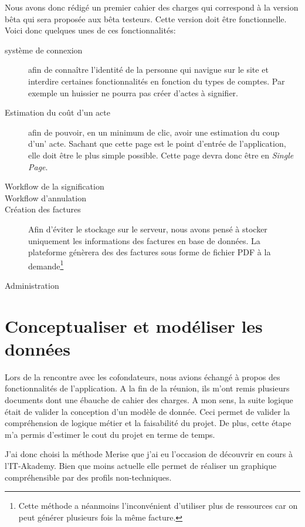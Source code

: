 \documentclass[]{report}
\begin{document}
    Nous avons donc rédigé un premier cahier des charges qui correspond à la version bêta qui sera proposée aux bêta testeurs. Cette version doit être fonctionnelle. Voici donc quelques unes de ces fonctionnalités:

    \begin{description}
      \item[système de connexion] afin de connaître l’identité de la personne qui navigue sur le site et interdire certaines fonctionnalités en fonction du types de comptes. Par exemple un huissier ne pourra pas créer d'actes à signifier.
      \item[Estimation du coût d'un acte] afin de pouvoir, en un minimum de clic, avoir une estimation du coup d'un' acte. Sachant que cette page est le point d'entrée de l'application, elle doit être le plus simple possible. Cette page devra donc être en \textit{Single Page}.
      \item[Workflow de la signification] %
      \item[Workflow d'annulation] %
      \item[Création des factures] Afin d'éviter le stockage sur le serveur, nous avons pensé à stocker uniquement les informations des factures en base de données. La plateforme génèrera des des factures sous forme de fichier PDF à la demande\footnote{Cette méthode a néanmoins l'inconvénient d'utiliser plus de ressources car on peut générer plusieurs fois la même facture.}
      \item[Administration] %
    \end{description}


  \section{Conceptualiser et modéliser les données}

    Lors de la rencontre avec les cofondateurs, nous avions échangé à propos des fonctionnalités de l'application. A la fin de la réunion, ils m'ont remis plusieurs documents dont une ébauche de cahier des charges. A mon sens, la suite logique était de valider la conception d'un modèle de donnée. Ceci permet de valider la compréhension de logique métier et la faisabilité du projet. De plus, cette étape m'a permis d'estimer le cout du projet en terme de temps.

    J'ai donc choisi la méthode Merise que j'ai eu l'occasion de découvrir en cours à l'IT-Akademy. Bien que moins actuelle elle permet de réaliser un graphique compréhensible par des profils non-techniques.
\end{document}
